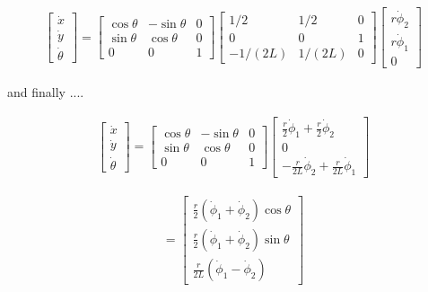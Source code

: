 \[\begin{aligned}
\begin{bmatrix}\dot{x} \\ \dot{y} \\ \dot{\theta} \end{bmatrix}
= \begin{bmatrix} \cos \theta & -\sin \theta & 0 \\ \sin \theta &
\cos \theta & 0 \\  0 & 0 & 1  \end{bmatrix}
\begin{bmatrix} 1/2 & 1/2 & 0 \\ 0 & 0 & 1 \\ -1/(2L) & 1/(2L) & 0 \end{bmatrix}
\begin{bmatrix} r\dot{\phi}_2 \\ r\dot{\phi}_1 \\ 0\end{bmatrix}
\end{aligned}\]

and finally ....

\[\begin{aligned}
\begin{bmatrix}\dot{x} \\ \dot{y} \\ \dot{\theta} \end{bmatrix}
= \begin{bmatrix} \cos \theta & -\sin \theta & 0 \\ \sin \theta &
\cos \theta & 0 \\  0 & 0 & 1  \end{bmatrix}
 \begin{bmatrix} \frac{r}{2}\dot{\phi}_1 + \frac{r}{2}\dot{\phi}_2 \\ 0   \\
 -\frac{r}{2L}\dot{\phi}_2 + \frac{r}{2L}\dot{\phi}_1  \end{bmatrix}
\end{aligned}\]

\[\begin{aligned}
= \begin{bmatrix}  \frac{r}{2}\left(\dot{\phi}_1 + \dot{\phi}_2\right)\cos \theta \\
\frac{r}{2}\left(\dot{\phi}_1 + \dot{\phi}_2\right)\sin \theta \\
\frac{r}{2L}\left(\dot{\phi}_1 -\dot{\phi}_2\right) \end{bmatrix}
\end{aligned}\]

